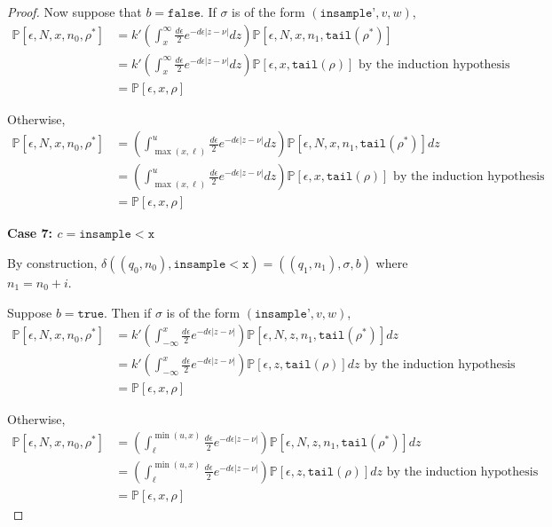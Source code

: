 \documentclass[12pt]{article}
\newcommand{\PP}{\mathbb{P}}
\newcommand{\lguard}{\texttt{insample} < \texttt{x}}
\theoremstyle{definition}
\begin{document}
\begin{proof}
	Now suppose that $b = \texttt{false}$. If $\sigma$ is of the form $(\texttt{insample'}, v, w)$, 
	\begin{align*}
		\PP[\epsilon, N, x, n_0, \rho^*] &= k'\left(\int_x^\infty\frac{d\epsilon}{2}e^{-d\epsilon|z-\nu|}dz\right)\PP[\epsilon, N, x, n_1, \texttt{tail}(\rho^*)]\\
		&= k'\left(\int_x^\infty\frac{d\epsilon}{2}e^{-d\epsilon|z-\nu|}dz\right)\PP[\epsilon, x, \texttt{tail}(\rho)] \text{ by the induction hypothesis }\\
		&= \PP[\epsilon, x, \rho]
	\end{align*}


	Otherwise, 
	\begin{align*}
		\PP[\epsilon, N, x, n_0, \rho^*] &= \left(\int_{\max(x, \ell)}^u\frac{d\epsilon}{2}e^{-d\epsilon|z-\nu|}dz\right)\PP[\epsilon, N, x, n_1, \texttt{tail}(\rho^*)]dz \\
		&= \left(\int_{\max(x, \ell)}^u\frac{d\epsilon}{2}e^{-d\epsilon|z-\nu|}dz\right)\PP[\epsilon, x, \texttt{tail}(\rho)] \text{ by the induction hypothesis }\\
		&= \PP[\epsilon, x, \rho]
	\end{align*}

	\textbf{Case 7: $c = \lguard$}

	By construction, $\delta((q_0, n_0), \lguard) = ((q_1, n_1), \sigma, b)$ where $n_1 = n_0+i$. 

	Suppose $b = \texttt{true}$. Then if $\sigma$ is of the form $(\texttt{insample'}, v, w)$, 
		\begin{align*}
			\PP[\epsilon, N, x, n_0, \rho^*] &= k'\left(\int_{-\infty}^x\frac{d\epsilon}{2}e^{-d\epsilon|z-\nu|}\right)\PP[\epsilon, N, z, n_1, \texttt{tail}(\rho^*)]dz \\
			&= k'\left(\int_{-\infty}^x\frac{d\epsilon}{2}e^{-d\epsilon|z-\nu|}\right)\PP[\epsilon, z, \texttt{tail}(\rho)]dz \text{ by the induction hypothesis }\\
			&= \PP[\epsilon, x, \rho]
		\end{align*}
	
	Otherwise, 
	\begin{align*}
		\PP[\epsilon, N, x, n_0, \rho^*] &= \left(\int_{\ell}^{\min(u, x)}\frac{d\epsilon}{2}e^{-d\epsilon|z-\nu|}\right)\PP[\epsilon, N, z, n_1, \texttt{tail}(\rho^*)]dz \\
		&= \left(\int_{\ell}^{\min(u, x)}\frac{d\epsilon}{2}e^{-d\epsilon|z-\nu|}\right)\PP[\epsilon, z, \texttt{tail}(\rho)]dz \text{ by the induction hypothesis }\\
		&= \PP[\epsilon, x, \rho]
	\end{align*}


\end{proof}
\end{document}
